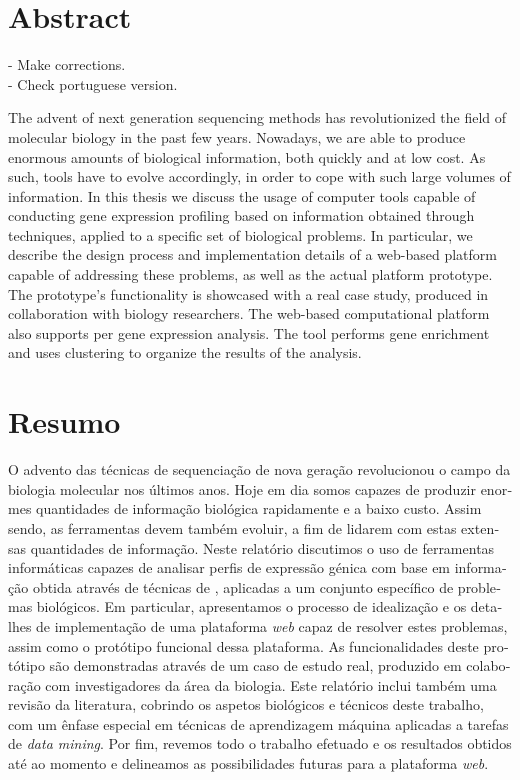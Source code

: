 \chapter*{Abstract}

\begin{Notes}
- Make corrections.\\
- Check portuguese version.\\
\end{Notes}

The advent of next generation sequencing methods has revolutionized the field of
molecular biology in the past few years. Nowadays, we are able to produce
enormous amounts of biological information, both quickly and at low cost. As
such, tools have to evolve accordingly, in order to cope with such large volumes
of information. In this thesis we discuss the usage of computer tools capable of
conducting gene expression profiling based on information obtained through
\rnaseq{} techniques, applied to a specific set of biological problems. In
particular, we describe the design process and implementation details of a
web-based platform capable of addressing these problems, as well as the actual
platform prototype. The prototype's functionality is showcased with a real case
study, produced in collaboration with biology researchers. The web-based
computational platform also supports per gene expression analysis. The tool
performs gene enrichment and uses clustering to organize the results of the
analysis.

\chapter*{Resumo}

\begin{otherlanguage}{portuguese}
O advento das técnicas de sequenciação de nova geração revolucionou o campo da
biologia molecular nos últimos anos. Hoje em dia somos capazes de produzir
enormes quantidades de informação biológica rapidamente e a baixo custo. Assim
sendo, as ferramentas devem também evoluir, a fim de lidarem com estas extensas
quantidades de informação. Neste relatório discutimos o uso de ferramentas
informáticas capazes de analisar perfis de expressão génica com base em
informação obtida através de técnicas de \textit{\rnaseq{}}, aplicadas a um
conjunto específico de problemas biológicos. Em particular, apresentamos o
processo de idealização e os detalhes de implementação de uma plataforma
\textit{web} capaz de resolver estes problemas, assim como o protótipo funcional
dessa plataforma. As funcionalidades deste protótipo são demonstradas através de
um caso de estudo real, produzido em colaboração com investigadores da área da
biologia. Este relatório inclui também uma revisão da literatura, cobrindo os
aspetos biológicos e técnicos deste trabalho, com um ênfase especial em técnicas
de aprendizagem máquina aplicadas a tarefas de \textit{data mining}. Por fim,
revemos todo o trabalho efetuado e os resultados obtidos até ao momento e
delineamos as possibilidades futuras para a plataforma \textit{web}.
\end{otherlanguage}
